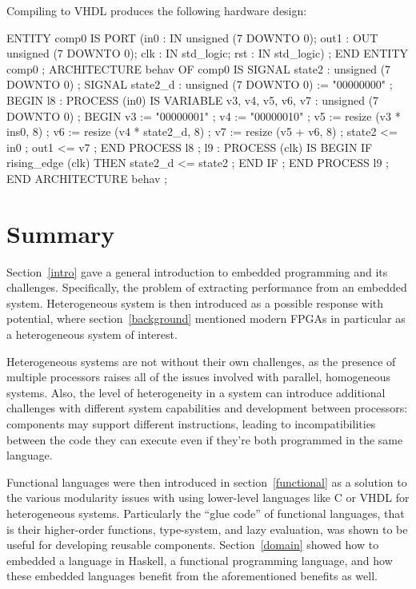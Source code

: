 \documentclass[../paper.tex]{subfiles}
\begin{document}
Compiling  to VHDL produces the following hardware design:

\begin{code}
ENTITY comp0 IS
  PORT (in0 : IN unsigned (7 DOWNTO 0);
        out1 : OUT unsigned (7 DOWNTO 0);
        clk : IN std_logic;
        rst : IN std_logic) ;
END ENTITY comp0 ;
ARCHITECTURE behav OF comp0 IS
  SIGNAL state2 : unsigned (7 DOWNTO 0) ;
  SIGNAL state2_d : unsigned (7 DOWNTO 0) := "00000000" ;
BEGIN
  l8 :
    PROCESS (in0) IS
      VARIABLE v3, v4, v5, v6, v7 : unsigned (7 DOWNTO 0) ; 
    BEGIN
      v3 := "00000001" ;
      v4 := "00000010" ;
      v5 := resize (v3 * ins0, 8) ;
      v6 := resize (v4 * state2_d, 8) ;
      v7 := resize (v5 + v6, 8) ;
      state2 <= in0 ;
      out1 <= v7 ;
    END PROCESS l8 ;
  l9 :
    PROCESS (clk) IS
    BEGIN
      IF rising_edge (clk) THEN
        state2_d <= state2 ;
      END IF ;
    END PROCESS l9 ;
END ARCHITECTURE behav ;
\end{code}

\section{Summary}

Section~\ref{intro} gave a general introduction to embedded programming and its challenges. Specifically, the problem of extracting performance from an embedded system. Heterogeneous system is then introduced as a possible response with potential, where section~\ref{background} mentioned modern FPGAs in particular as a heterogeneous system of interest.

Heterogeneous systems are not without their own challenges, as the presence of multiple processors raises all of the issues involved with parallel, homogeneous systems. Also, the level of heterogeneity in a system can introduce additional challenges with different system capabilities and development between processors: components may support different instructions, leading to incompatibilities between the code they can execute even if they're both programmed in the same language.

Functional languages were then introduced in section~\ref{functional} as a solution to the various modularity issues with using lower-level languages like C or VHDL for heterogeneous systems. Particularly the ``glue code'' of functional languages, that is their higher-order functions, type-system, and lazy evaluation, was shown to be useful for developing reusable components. Section~\ref{domain} showed how to embedded a language in Haskell, a functional programming language, and how these embedded languages benefit from the aforementioned benefits as well.
\end{document}

